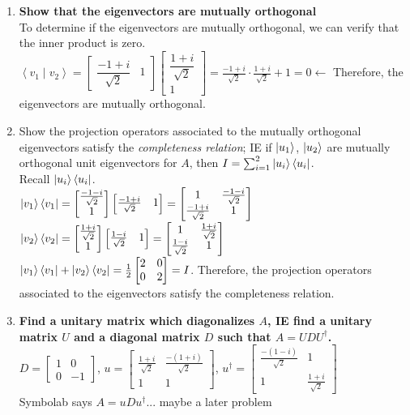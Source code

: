 \documentclass[12pt]{article}
\theoremstyle{plain}
\theoremstyle{nonumberplain}
\theoremstyle{plain}
\theoremstyle{nonumberplain}
\newcommand\1{{\bf 1}}
\newcommand{\bmat}[1]{\begin{bmatrix*} #1 \end{bmatrix*}} %
\newcommand{\<}{\left\langle}
\renewcommand{\>}{\right\rangle}
\newcommand{\inp}[2]{\left\langle#1\mid #2\right\rangle} %
\begin{document}
\begin{enumerate}[label=(\alph*)]
\item \textbf{Show that the eigenvectors are mutually orthogonal} \\
To determine if the eigenvectors are mutually orthogonal, we can verify that the inner product is zero. \\
$\inp{v_1}{v_2}=\bmat{\dfrac{-1+i}{\sqrt{2}} & 1}\bmat{\dfrac{1+i}{\sqrt{2}} \\ 1}=\frac{-1+i}{\sqrt{2}}\cdot\frac{1+i}{\sqrt{2}}+1=0\longleftarrow$ Therefore, the eigenvectors are mutually orthogonal.
\item Show the projection operators associated to the mutually orthogonal eigenvectors satisfy the \textit{completeness relation}; IE if $\ket{u_1}$, $\ket{u_2}$ are mutually orthogonal unit eigenvectors for $A$, then $I=\sum^2_{i=1}\ket{u_i}\bra{u_i}$. \\
Recall $\ket{u_i}\bra{u_i}$. \\
$\ket{v_1}\bra{v_1}=\bmat{\frac{-1-i}{\sqrt{2}} \\ 1}\bmat{\frac{-1+i}{\sqrt{2}} & 1}=\bmat{1 & \frac{-1-i}{\sqrt{2}} \\ \frac{-1+i}{\sqrt{2}} & 1}$ \\
$\ket{v_2}\bra{v_2}=\bmat{\frac{1+i}{\sqrt{2}} \\ 1}\bmat{\frac{1-i}{\sqrt{2}} & 1}=\bmat{1 & \frac{1+i}{\sqrt{2}} \\ \frac{1-i}{\sqrt{2}} & 1}$ \\
$\ket{v_1}\bra{v_1}+\ket{v_2}\bra{v_2}=\frac{1}{2}\bmat{2 & 0 \\ 0 & 2}=I$. Therefore, the projection operators associated to the eigenvectors satisfy the completeness relation.
\item \textbf{Find a unitary matrix which diagonalizes $A$, IE find a unitary matrix $U$ and a diagonal matrix $D$ such that $A=UDU^\dagger$. }\\
$D=\bmat{1 & 0 \\ 0 & -1}$, $u=\bmat{ \frac{1+i}{\sqrt{2}} & \frac{-(1+i)}{\sqrt{2}} \\ 1 & 1}$, $u^\dagger=\bmat{\frac{-(1-i)}{\sqrt{2}} & 1 \\ 1 & \frac{1+i}{\sqrt{2}}}$ \\
Symbolab says $A=uDu^\dagger$... maybe a later problem
\end{enumerate}

\end{document}
